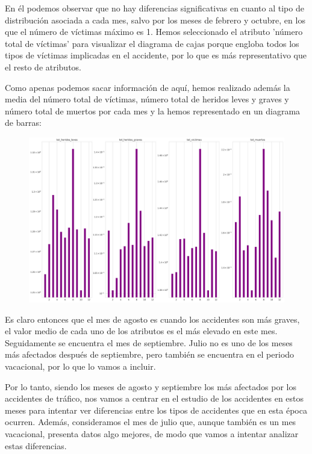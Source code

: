\documentclass[a4paper,11pt]{book}
\begin{document}
En él podemos observar que no hay diferencias significativas en cuanto al tipo de distribución asociada a cada mes, salvo por los meses de febrero y octubre, en los que el número de víctimas máximo es 1. Hemos seleccionado el atributo 'número total de víctimas' para visualizar el diagrama de cajas porque engloba todos los tipos de víctimas implicadas en el accidente, por lo que es más representativo que el resto de atributos. 

Como apenas podemos sacar información de aquí, hemos realizado además la media del número total de víctimas, número total de heridos leves y graves y número total de muertos por cada mes y la hemos representado en un diagrama de barras:
\begin{figure}[H]
	\centering
	\includegraphics[width=1.1\linewidth]{img/influencia_mes}
	\caption{}
	\label{fig:influenciames}
\end{figure}

Es claro entonces que el mes de agosto es cuando los accidentes son más graves, el valor medio de cada uno de los atributos es el más elevado en este mes. Seguidamente se encuentra el mes de septiembre. Julio no es uno de los meses más afectados después de septiembre, pero también se encuentra en el periodo vacacional, por lo que lo vamos a incluir. 

Por lo tanto, siendo los meses de agosto y septiembre los más afectados por los accidentes de tráfico, nos vamos a centrar en el estudio de los accidentes en estos meses para intentar ver diferencias entre los tipos de accidentes que en esta época ocurren. Además, consideramos el mes de julio que, aunque también es un mes vacacional, presenta datos algo mejores, de modo que vamos a intentar analizar estas diferencias. 
\end{document}
